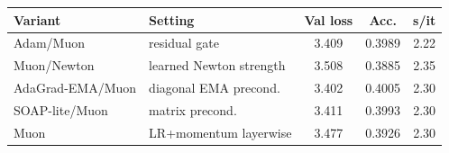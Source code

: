\begin{tabular}{llccc}
\toprule
\textbf{Variant} & \textbf{Setting} & \textbf{Val loss} & \textbf{Acc.} & \textbf{s/it} \\
\midrule
Adam/Muon & residual gate & 3.409 & 0.3989 & 2.22 \\
Muon/Newton & learned Newton strength & 3.508 & 0.3885 & 2.35 \\
AdaGrad-EMA/Muon & diagonal EMA precond. & 3.402 & 0.4005 & 2.30 \\
SOAP-lite/Muon & matrix precond. & 3.411 & 0.3993 & 2.30 \\
Muon & LR+momentum layerwise & 3.477 & 0.3926 & 2.30 \\
\bottomrule
\end{tabular}
